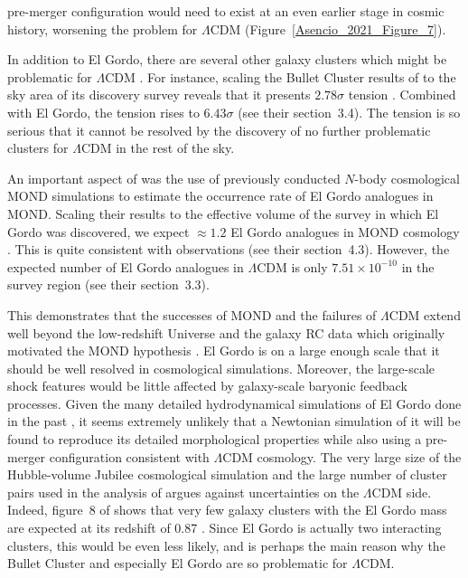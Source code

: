 \documentclass[fleqn,usenatbib,useAMS]{mnras} %
\begin{document}
pre-merger configuration would need to exist at an even earlier stage in cosmic history, worsening the problem for $\Lambda$CDM (Figure~\ref{Asencio_2021_Figure_7}).

In addition to El Gordo, there are several other galaxy clusters which might be problematic for $\Lambda$CDM \citep{Asencio_2021}. For instance, scaling the Bullet Cluster results of \citet{Kraljic_2015} to the sky area of its discovery survey reveals that it presents $2.78\sigma$ tension \citep{Asencio_2021}. Combined with El Gordo, the tension rises to $6.43\sigma$ (see their section~3.4). The tension is so serious that it cannot be resolved by the discovery of no further problematic clusters for $\Lambda$CDM in the rest of the sky.

An important aspect of \citet{Asencio_2021} was the use of previously conducted $N$-body cosmological MOND simulations \citep{Katz_2013} to estimate the occurrence rate of El Gordo analogues in MOND. Scaling their results to the effective volume of the survey in which El Gordo was discovered, we expect $\approx 1.2$ El Gordo analogues in MOND cosmology \citep{Asencio_2021}. This is quite consistent with observations (see their section~4.3). However, the expected number of El Gordo analogues in $\Lambda$CDM is only $7.51 \times 10^{-10}$ in the survey region (see their section~3.3).

This demonstrates that the successes of MOND and the failures of $\Lambda$CDM extend well beyond the low-redshift Universe and the galaxy RC data which originally motivated the MOND hypothesis \citep{Milgrom_1983}. El Gordo is on a large enough scale that it should be well resolved in cosmological simulations. Moreover, the large-scale shock features would be little affected by galaxy-scale baryonic feedback processes. Given the many detailed hydrodynamical simulations of El Gordo done in the past \citep{Donnert_2014, Molnar_2015, Ng_2015, Zhang_2015}, it seems extremely unlikely that a Newtonian simulation of it will be found to reproduce its detailed morphological properties while also using a pre-merger configuration consistent with $\Lambda$CDM cosmology. The very large size of the Hubble-volume Jubilee cosmological simulation and the large number of cluster pairs used in the analysis of \citet{Asencio_2021} argues against uncertainties on the $\Lambda$CDM side. Indeed, figure~8 of \citet{Bohringer_2017} shows that very few galaxy clusters with the El Gordo mass are expected at its redshift of 0.87 \citep{Menanteau_2012}. Since El Gordo is actually two interacting clusters, this would be even less likely, and is perhaps the main reason why the Bullet Cluster and especially El Gordo are so problematic for $\Lambda$CDM.
\end{document}
